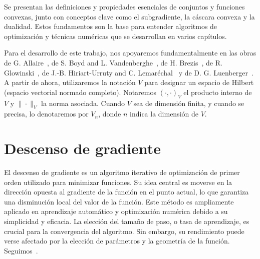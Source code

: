 \documentclass[12pt]{book}
\theoremstyle{definition}
\theoremstyle{plain}
\theoremstyle{remark}
\begin{document}
Se presentan las definiciones y propiedades esenciales de conjuntos y funciones convexas, junto con conceptos clave como el subgradiente, la cáscara convexa y la dualidad. Estos fundamentos son la base para entender algoritmos de optimización y técnicas numéricas que se desarrollan en varios capítulos.



Para el desarrollo de este trabajo, nos apoyaremos fundamentalmente en las obras de G. Allaire~\cite{allaire2007},
de S. Boyd and L. Vandenberghe~\cite{BoydVandenberghe2004},
de H. Brezis~\cite{brezis2011}, de R. Glowinski~\cite{glowinski1984},
de J.-B. Hiriart-Urruty and C. Lemar\'{e}chal~\cite{hiriart2001}
y de D. G. Luenberger~\cite{luenberger1969}. 
A partir de ahora, utilizaremos la notación $V$ para designar un espacio de Hilbert (espacio vectorial normado completo). 
Notaremos $(\cdot,\cdot)_V$ el producto interno de $V$ y $\| \cdot \|_V$ la norma asociada.
Cuando $V$ sea de dimensión finita, y cuando se precisa, lo denotaremos por $V_n$, donde $n$ indica la dimensión de $V$.

\chapter{Descenso de gradiente}
El descenso de gradiente es un algoritmo iterativo de optimización de primer orden utilizado para minimizar funciones. Su idea central es moverse en la dirección opuesta al gradiente de la función en el punto actual, lo que garantiza una disminución local del valor de la función. Este método es ampliamente aplicado en aprendizaje automático y optimización numérica debido a su simplicidad y eficacia. La elección del tamaño de paso, o tasa de aprendizaje, es crucial para la convergencia del algoritmo. Sin embargo, su rendimiento puede verse afectado por la elección de parámetros y la geometría de la función. Seguimos~\cite{allaire2007}.
\end{document}
